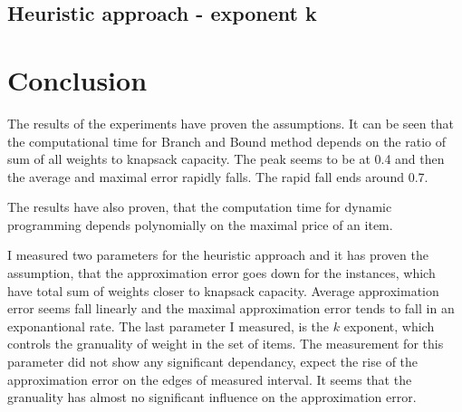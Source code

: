 \documentclass{article}
\begin{document}
	\subsection{Heuristic approach - exponent k}
	\begin{figure}[h!]
		\centering

	\end{figure}

\section{Conclusion}
	The results of the experiments have proven the assumptions. It can be seen that the computational time for Branch and Bound method depends on the ratio of sum of all weights to knapsack capacity. The peak seems to be at 0.4 and then the average and maximal error rapidly falls. The rapid fall ends around 0.7.

	The results have also proven, that the computation time for dynamic programming depends polynomially on the maximal price of an item.

	I measured two parameters for the heuristic approach and it has proven the assumption, that the approximation error goes down for the instances, which have total sum of weights closer to knapsack capacity. Average approximation error seems fall linearly and the maximal approximation error tends to fall in an exponantional rate. The last parameter I measured, is the $k$ exponent, which controls the granuality of weight in the set of items. The measurement for this parameter did not show any significant dependancy, expect the rise of the approximation error on the edges of measured interval. It seems that the granuality has almost no significant influence on the approximation error.
\end{document}
